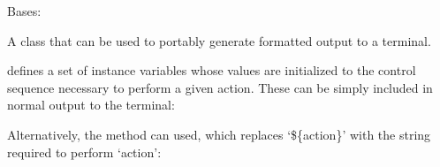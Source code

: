 \documentclass[letterpaper,10pt,english]{sphinxmanual}
\begin{document}
\begin{fulllineitems}
\label{\detokenize{classes:classes.pyTerminal.TerminalController}}
\pysigstartsignatures
{}
\pysigstopsignatures
\sphinxAtStartPar
Bases: 

\sphinxAtStartPar
A class that can be used to portably generate formatted output to
a terminal.

\sphinxAtStartPar
{} defines a set of instance variables whose
values are initialized to the control sequence necessary to
perform a given action.  These can be simply included in normal
output to the terminal:

\begin{sphinxVerbatim}[commandchars=\\\{\}]
  
 
\end{sphinxVerbatim}

\sphinxAtStartPar
Alternatively, the  method can used, which replaces
‘\$\{action\}’ with the string required to perform ‘action’:

\begin{sphinxVerbatim}[commandchars=\\\{\}]
  
 
\end{sphinxVerbatim}


\end{fulllineitems}
\end{document}

